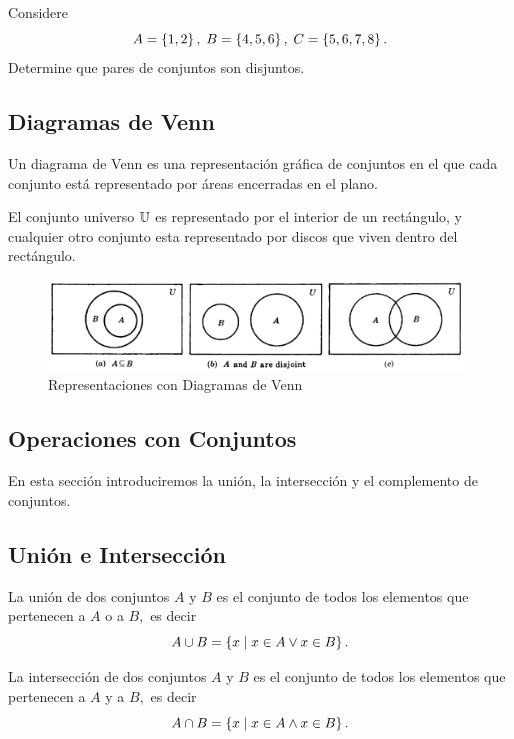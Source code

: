 	\begin{exmp}
		Considere $$
		A=\left\{ 1,2 \right\}, \; B=\left\{ 4,5,6 \right\}, \; C=\left\{ 5,6,7,8 \right\}.
		$$
		Determine que pares de conjuntos son disjuntos. 
	\end{exmp}
	


\subsection{Diagramas de Venn}


	Un diagrama de Venn es una representaci\'on gr\'afica de conjuntos en el que cada conjunto est\'a representado por \'areas encerradas en el plano.



	El conjunto universo $\mathbb{U}$ es representado por el interior de un rect\'angulo, y cualquier otro conjunto esta representado por discos que viven dentro del rect\'angulo.



	\begin{figure}
		\centering
		\includegraphics[width=11cm,keepaspectratio=true]{./md/venn01.png}
		\caption{Representaciones con Diagramas de Venn}
		\label{fig:0101}
	\end{figure}
	


\subsection{Operaciones con Conjuntos}


	En esta secci\'on introduciremos la uni\'on, la intersecci\'on y el complemento de conjuntos.


\subsection{Uni\'on e Intersecci\'on}


	La uni\'on de dos conjuntos $A$ y $B$ es el conjunto de todos los elementos que pertenecen a $A$ o a $B,$  es decir
	$$
	A \cup B = \left\{ x \mid x\in A \vee x\in B \right\}.
	$$



	La intersecci\'on de dos conjuntos $A$ y $B$ es el conjunto de todos los elementos que pertenecen a $A$ y a $B,$  es decir
	$$
	A \cap B = \left\{ x \mid x\in A \wedge x\in B \right\}.
	$$



